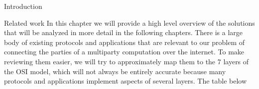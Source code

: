 \begin{frame}
\tableofcontents

\printnoidxglossary[type=\acronymtype,title=List of Abbreviations]
\listoffigures

\mainmatter
\end{frame}

\begin{frame}{Introduction}
\protect\hypertarget{introduction}{}
\end{frame}

\begin{frame}[fragile]{Related work}
\protect\hypertarget{related-work}{}
In this chapter we will provide a high level overview of the solutions
that will be analyzed in more detail in the following chapters. There is
a large body of existing protocols and applications that are relevant to
our problem of connecting the parties of a multiparty computation over
the internet. To make reviewing them easier, we will try to
approximately map them to the 7 layers of the OSI model, which will not
always be entirely accurate because many protocols and applications
implement aspects of several layers. The table below


\end{frame}
